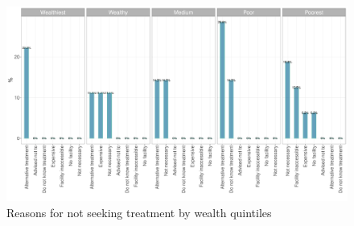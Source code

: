 \documentclass[12pt,a4paper]{article}
\begin{document}
\begin{figure}[H]

{\centering \includegraphics{kayinReport_files/figure-latex/fever4plot-1} 

}

\caption{Reasons for not seeking treatment by wealth quintiles}\label{fig:fever4plot}
\end{figure}
\end{document}
